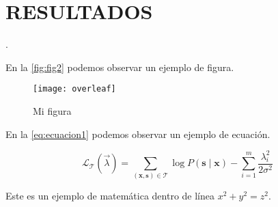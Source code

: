 \chapter{RESULTADOS}

\lipsum[1-1]\autocite{texbook,latex:companion}.

En la \autoref{fig:fig2} podemos observar un ejemplo de figura.

\begin{figure}[H]
	\centering
	\texttt{[image: overleaf]}
	\caption{Mi figura}\label{fig:fig2}
\end{figure}

En la \autoref{eq:ecuacion1} podemos observar un ejemplo de ecuación.

\begin{eq}[H]
	\caption{Mi ecuación}\label{eq:ecuacion1}
	\[
		\mathcal L_{\mathcal T}(\vec{\lambda})
		= \sum_{(\mathbf{x},\mathbf{s})\in \mathcal T}
		\log P(\mathbf{s}\mid\mathbf{x}) - \sum_{i=1}^m
		\frac{\lambda_i^2}{2\sigma^2}
	\]
\end{eq}



Este es un ejemplo de matemática dentro de línea \(x^2 + y^2 = z^2\).

